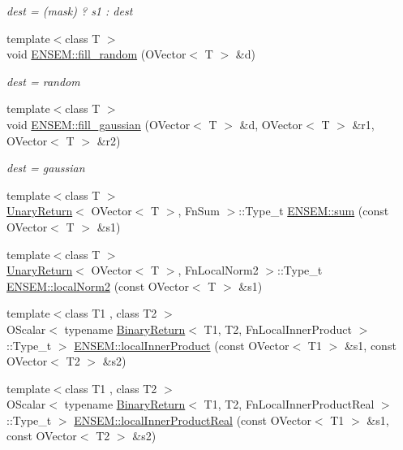 \begin{DoxyCompactItemize}
\begin{DoxyCompactList}\small\item\em dest = (mask) ? s1 \+: dest \end{DoxyCompactList}\item 
{\footnotesize template$<$class T $>$ }\\void \mbox{\hyperlink{group__obsvector_ga1ba77da0ffafb0320b14d1dd9fa47179}{E\+N\+S\+E\+M\+::fill\+\_\+random}} (O\+Vector$<$ T $>$ \&d)
\begin{DoxyCompactList}\small\item\em dest = random \end{DoxyCompactList}\item 
{\footnotesize template$<$class T $>$ }\\void \mbox{\hyperlink{group__obsvector_ga0830d11c7cf74530fe40c56bc99ceb29}{E\+N\+S\+E\+M\+::fill\+\_\+gaussian}} (O\+Vector$<$ T $>$ \&d, O\+Vector$<$ T $>$ \&r1, O\+Vector$<$ T $>$ \&r2)
\begin{DoxyCompactList}\small\item\em dest = gaussian \end{DoxyCompactList}\item 
{\footnotesize template$<$class T $>$ }\\\mbox{\hyperlink{structUnaryReturn}{Unary\+Return}}$<$ O\+Vector$<$ T $>$, Fn\+Sum $>$\+::Type\+\_\+t \mbox{\hyperlink{group__obsvector_gaea84ad793fea0a58204b33a7bcee51b4}{E\+N\+S\+E\+M\+::sum}} (const O\+Vector$<$ T $>$ \&s1)
\item 
{\footnotesize template$<$class T $>$ }\\\mbox{\hyperlink{structUnaryReturn}{Unary\+Return}}$<$ O\+Vector$<$ T $>$, Fn\+Local\+Norm2 $>$\+::Type\+\_\+t \mbox{\hyperlink{group__obsvector_ga84dbc523abff754a5ecdd0658eb687e1}{E\+N\+S\+E\+M\+::local\+Norm2}} (const O\+Vector$<$ T $>$ \&s1)
\item 
{\footnotesize template$<$class T1 , class T2 $>$ }\\O\+Scalar$<$ typename \mbox{\hyperlink{structBinaryReturn}{Binary\+Return}}$<$ T1, T2, Fn\+Local\+Inner\+Product $>$\+::Type\+\_\+t $>$ \mbox{\hyperlink{group__obsvector_gad915d71f08c700574f01f93a9689eb82}{E\+N\+S\+E\+M\+::local\+Inner\+Product}} (const O\+Vector$<$ T1 $>$ \&s1, const O\+Vector$<$ T2 $>$ \&s2)
\item 
{\footnotesize template$<$class T1 , class T2 $>$ }\\O\+Scalar$<$ typename \mbox{\hyperlink{structBinaryReturn}{Binary\+Return}}$<$ T1, T2, Fn\+Local\+Inner\+Product\+Real $>$\+::Type\+\_\+t $>$ \mbox{\hyperlink{group__obsvector_ga1a740c7927429957c8bc0b75d070bb71}{E\+N\+S\+E\+M\+::local\+Inner\+Product\+Real}} (const O\+Vector$<$ T1 $>$ \&s1, const O\+Vector$<$ T2 $>$ \&s2)

\end{DoxyCompactItemize}

